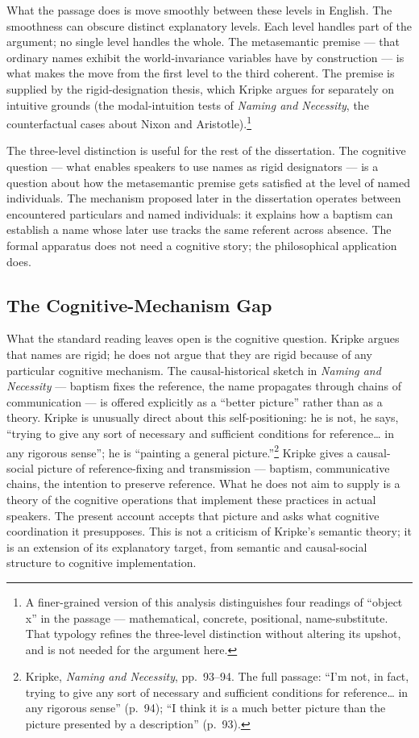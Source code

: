 \documentclass[12pt,a4paper]{article}
\begin{document}
What the passage does is move smoothly between these levels in English. The smoothness can obscure distinct explanatory levels. Each level handles part of the argument; no single level handles the whole. The metasemantic premise --- that ordinary names exhibit the world-invariance variables have by construction --- is what makes the move from the first level to the third coherent. The premise is supplied by the rigid-designation thesis, which Kripke argues for separately on intuitive grounds (the modal-intuition tests of \emph{Naming and Necessity}, the counterfactual cases about Nixon and Aristotle).\footnote{A finer-grained version of this analysis distinguishes four readings of ``object x'' in the passage --- mathematical, concrete, positional, name-substitute. That typology refines the three-level distinction without altering its upshot, and is not needed for the argument here.}

The three-level distinction is useful for the rest of the dissertation. The cognitive question --- what enables speakers to use names as rigid designators --- is a question about how the metasemantic premise gets satisfied at the level of named individuals. The mechanism proposed later in the dissertation operates between encountered particulars and named individuals: it explains how a baptism can establish a name whose later use tracks the same referent across absence. The formal apparatus does not need a cognitive story; the philosophical application does.

\subsection{The Cognitive-Mechanism Gap}\label{the-cognitive-mechanism-gap}

What the standard reading leaves open is the cognitive question. Kripke argues that names are rigid; he does not argue that they are rigid because of any particular cognitive mechanism. The causal-historical sketch in \emph{Naming and Necessity} --- baptism fixes the reference, the name propagates through chains of communication --- is offered explicitly as a ``better picture'' rather than as a theory. Kripke is unusually direct about this self-positioning: he is not, he says, ``trying to give any sort of necessary and sufficient conditions for reference\ldots{} in any rigorous sense''; he is ``painting a general picture.''\footnote{Kripke, \emph{Naming and Necessity}, pp.~93--94. The full passage: ``I'm not, in fact, trying to give any sort of necessary and sufficient conditions for reference\ldots{} in any rigorous sense'' (p.~94); ``I think it is a much better picture than the picture presented by a description'' (p.~93).} Kripke gives a causal-social picture of reference-fixing and transmission --- baptism, communicative chains, the intention to preserve reference. What he does not aim to supply is a theory of the cognitive operations that implement these practices in actual speakers. The present account accepts that picture and asks what cognitive coordination it presupposes. This is not a criticism of Kripke's semantic theory; it is an extension of its explanatory target, from semantic and causal-social structure to cognitive implementation.
\end{document}
